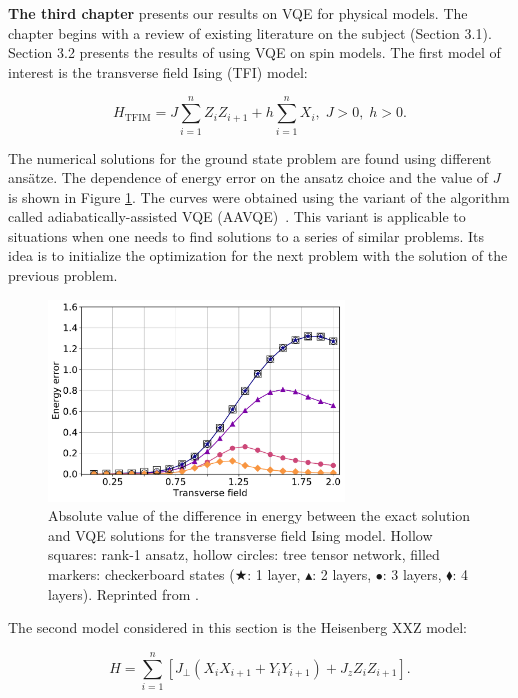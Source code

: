 \textbf{The third chapter} presents our results on VQE for physical models. The chapter begins with a review of existing literature on the subject (Section 3.1). Section 3.2 presents the results of using VQE on spin models. The first model of interest is the transverse field Ising (TFI) model:

\begin{equation}\label{eq:tfim}
    H_\mathrm{TFIM}=J\sum\limits_{i=1}^n Z_i Z_{i+1} + h\sum\limits_{i=1}^n X_i, \; J>0, \; h>0.
\end{equation}

The numerical solutions for the ground state problem are found using different ans\"atze. The dependence of energy error on the ansatz choice and the value of $J$ is shown in Figure \ref{fig:dE_ising}. The curves were obtained using the variant of the algorithm called adiabatically-assisted VQE (AAVQE)~\cite{garcia-saez_addressing_2018}. This variant is applicable to situations when one needs to find solutions to a series of similar problems. Its idea is to initialize the optimization for the next problem with the solution of the previous problem.

\begin{figure}
    \centering
    \includegraphics[width=0.7\textwidth]{../figures/dE_ising.pdf}
    \caption{Absolute value of the difference in energy between the exact solution and VQE solutions for the transverse field Ising model. Hollow squares: rank-1 ansatz, hollow circles: tree tensor network, filled markers: checkerboard states ($\bigstar$: 1 layer, $\blacktriangle$: 2 layers, $\bullet$: 3 layers, $\blacklozenge$: 4 layers). Reprinted from \cite{uvarov_machine_2020}.}
    \label{fig:dE_ising}
\end{figure}

The second model considered in this section is the Heisenberg XXZ model:

\begin{equation}
    \label{eq:heisenberg_xxz}
    H = \sum_{i=1}^n \left[J_\perp\left(X_i X_{i+1} + Y_i Y_{i+1}\right)
        + J_z Z_i Z_{i+1}\right].
\end{equation}

